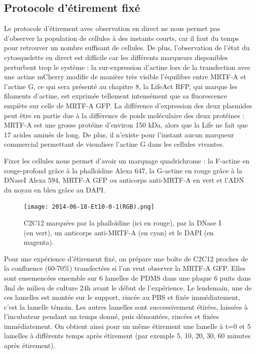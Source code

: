 	
	\subsection{Protocole d'étirement fixé}
	
	Le protocole d'étirement avec observation en direct ne nous permet pas d'observer la population de cellules à des instants courts, car il faut du temps pour retrouver un nombre suffisant de cellules. De plus, l'observation de l'état du cytosquelette en direct est difficile car les différents marqueurs disponibles perturbent trop le système : la sur-expression d'actine lors de la transfection avec une actine mCherry modifie de manière très visible l'équilibre entre MRTF-A et l'actine G, ce qui sera présenté au chapitre 8, la LifeAct RFP, qui marque les filaments d'actine, est exprimée tellement intensément que sa fluorescence empiète sur celle de MRTF-A GFP. La différence d'expression des deux plasmides peut être en partie due à la différence de poids moléculaire des deux protéines : MRTF-A est une grosse protéine d'environ 150 kDa, alors que la Life ne fait que 17 acides aminés de long. De plus, il n'existe pour l'instant aucun marqueur commercial permettant de visualiser l'actine G dans les cellules vivantes. 
	
	Fixer les cellules nous permet d'avoir un marquage quadrichrome : la F-actine en rouge-profond grâce à la phalloïdine Alexa 647, la G-actine en rouge grâce à la DNaseI Alexa 594, MRTF-A GFP ou anticorps anti-MRTF-A en vert et l'ADN du noyau en bleu grâce au DAPI. 
	
	\begin{figure}
	\texttt{[image: 2014-06-18-Et10-0-1(RGB).png]}
	\caption{C2C12 marquées par la phalloïdine (ici en rouge), par la DNase I (en vert), un anticorps anti-MRTF-A (en cyan) et le DAPI (en magenta).}
	\end{figure}
	
	Pour une expérience d'étirement fixé, on prépare une boîte de C2C12 proches de la confluence (60-70\%) transfectées si l'on veut observer la MRTF-A GFP. Elles sont ensemencées ensemble sur 6 lamelles de PDMS dans une plaque 6 puits dans 3ml de milieu de culture 24h avant le début de l'expérience. Le lendemain, une de ces lamelles est montée sur le support, rincée au PBS et fixée immédiatement, c'est la lamelle témoin. Les autres lamelles sont successivement étirées, laissées à l'incubateur pendant un temps donné, puis démontées, rincées et fixées immédiatement. On obtient ainsi pour un même étirement une lamelle à t=0 et 5 lamelles à différents temps après étirement (par exemple 5, 10, 20, 30, 60 minutes après étirement). 
	

